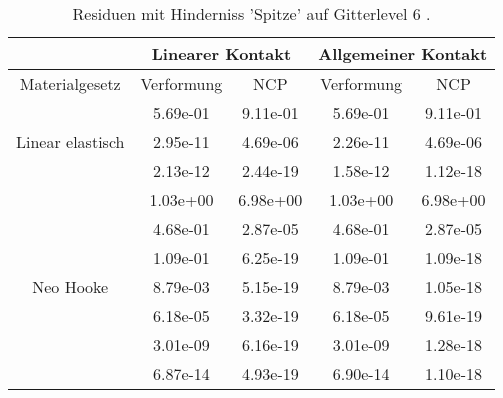 \begin{table} 
\centering 
\begin{tabular}{c|cc|cc|} 
\cline{2-5} 
 & \multicolumn{2}{|c|}{Linearer Kontakt} & \multicolumn{2}{|c|}{Allgemeiner Kontakt} \\ 
\hline 
\multicolumn{1}{|c|}{Materialgesetz} & \multicolumn{1}{c|}{Verformung} & \multicolumn{1}{c|}{NCP} & \multicolumn{1}{c|}{Verformung} & \multicolumn{1}{c|}{NCP} \\ 
\hline 
\multicolumn{1}{|c|}{\multirow{3}{*}{Linear elastisch}} &\multicolumn{1}{|c|}{  5.69e-01} & \multicolumn{1}{|c|}{  9.11e-01} & \multicolumn{1}{|c|}{  5.69e-01} & \multicolumn{1}{|c|}{  9.11e-01} \\ 
\multicolumn{1}{|c|}{} & \multicolumn{1}{|c|}{  2.95e-11} & \multicolumn{1}{|c|}{  4.69e-06} & \multicolumn{1}{|c|}{  2.26e-11} & \multicolumn{1}{|c|}{  4.69e-06} \\ 
\multicolumn{1}{|c|}{} & \multicolumn{1}{|c|}{  2.13e-12} & \multicolumn{1}{|c|}{  2.44e-19} & \multicolumn{1}{|c|}{  1.58e-12} & \multicolumn{1}{|c|}{  1.12e-18} \\ 
\hline 
\multicolumn{1}{|c|}{\multirow{7}{*}{Neo Hooke}} &\multicolumn{1}{|c|}{  1.03e+00} & \multicolumn{1}{|c|}{  6.98e+00} & \multicolumn{1}{|c|}{  1.03e+00} & \multicolumn{1}{|c|}{  6.98e+00} \\ 
\multicolumn{1}{|c|}{} & \multicolumn{1}{|c|}{  4.68e-01} & \multicolumn{1}{|c|}{  2.87e-05} & \multicolumn{1}{|c|}{  4.68e-01} & \multicolumn{1}{|c|}{  2.87e-05} \\ 
\multicolumn{1}{|c|}{} & \multicolumn{1}{|c|}{  1.09e-01} & \multicolumn{1}{|c|}{  6.25e-19} & \multicolumn{1}{|c|}{  1.09e-01} & \multicolumn{1}{|c|}{  1.09e-18} \\ 
\multicolumn{1}{|c|}{} & \multicolumn{1}{|c|}{  8.79e-03} & \multicolumn{1}{|c|}{  5.15e-19} & \multicolumn{1}{|c|}{  8.79e-03} & \multicolumn{1}{|c|}{  1.05e-18} \\ 
\multicolumn{1}{|c|}{} & \multicolumn{1}{|c|}{  6.18e-05} & \multicolumn{1}{|c|}{  3.32e-19} & \multicolumn{1}{|c|}{  6.18e-05} & \multicolumn{1}{|c|}{  9.61e-19} \\ 
\multicolumn{1}{|c|}{} & \multicolumn{1}{|c|}{  3.01e-09} & \multicolumn{1}{|c|}{  6.16e-19} & \multicolumn{1}{|c|}{  3.01e-09} & \multicolumn{1}{|c|}{  1.28e-18} \\ 
\multicolumn{1}{|c|}{} & \multicolumn{1}{|c|}{  6.87e-14} & \multicolumn{1}{|c|}{  4.93e-19} & \multicolumn{1}{|c|}{  6.90e-14} & \multicolumn{1}{|c|}{  1.10e-18} \\ 
\hline 
\end{tabular}\caption{Residuen mit Hinderniss 'Spitze' auf Gitterlevel 6 .}\label{tab:Residuum_Spitze_level6}
\end{table} 
